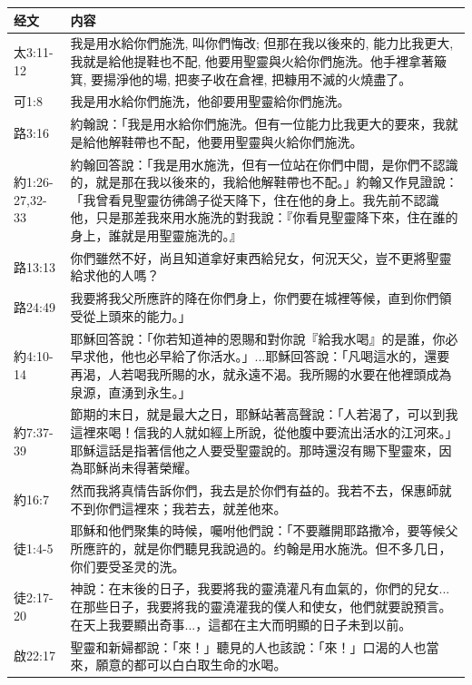 \begin{table}[H]
\centering
\begin{tabular}{p{4em}|p{44em}}  \toprule
经文&内容 \\  \midrule
太3:11-12&我是用水給你們施洗, 叫你們悔改; 但那在我以後來的, 能力比我更大, 我就是給他提鞋也不配, 他要用聖靈與火給你們施洗。他手裡拿著簸箕, 要揚淨他的場, 把麥子收在倉裡, 把糠用不滅的火燒盡了。\\  \midrule

可1:8&我是用水給你們施洗，他卻要用聖靈給你們施洗。\\  \midrule

路3:16&約翰說：「我是用水給你們施洗。但有一位能力比我更大的要來，我就是給他解鞋帶也不配，他要用聖靈與火給你們施洗。\\  \midrule

約1:26-27,32-33&約翰回答說：「我是用水施洗，但有一位站在你們中間，是你們不認識的，就是那在我以後來的，我給他解鞋帶也不配。」約翰又作見證說：「我曾看見聖靈彷彿鴿子從天降下，住在他的身上。我先前不認識他，只是那差我來用水施洗的對我說：『你看見聖靈降下來，住在誰的身上，誰就是用聖靈施洗的。』\\  \midrule

路13:13&你們雖然不好，尚且知道拿好東西給兒女，何況天父，豈不更將聖靈給求他的人嗎？\\  \midrule

路24:49&我要將我父所應許的降在你們身上，你們要在城裡等候，直到你們領受從上頭來的能力。」\\  \midrule

約4:10-14&耶穌回答說：「你若知道神的恩賜和對你說『給我水喝』的是誰，你必早求他，他也必早給了你活水。」...耶穌回答說：「凡喝這水的，還要再渴，人若喝我所賜的水，就永遠不渴。我所賜的水要在他裡頭成為泉源，直湧到永生。」\\  \midrule

約7:37-39&節期的末日，就是最大之日，耶穌站著高聲說：「人若渴了，可以到我這裡來喝！信我的人就如經上所說，從他腹中要流出活水的江河來。」耶穌這話是指著信他之人要受聖靈說的。那時還沒有賜下聖靈來，因為耶穌尚未得著榮耀。\\  \midrule

約16:7&然而我將真情告訴你們，我去是於你們有益的。我若不去，保惠師就不到你們這裡來；我若去，就差他來。\\  \midrule

徒1:4-5&耶穌和他們聚集的時候，囑咐他們說：「不要離開耶路撒冷，要等候父所應許的，就是你們聽見我說過的。约翰是用水施洗。但不多几日，你们要受圣灵的洗。\\  \midrule

徒2:17-20&神說：在末後的日子，我要將我的靈澆灌凡有血氣的，你們的兒女...在那些日子，我要將我的靈澆灌我的僕人和使女，他們就要說預言。在天上我要顯出奇事...，這都在主大而明顯的日子未到以前。\\  \midrule
啟22:17&聖靈和新婦都說：「來！」聽見的人也該說：「來！」口渴的人也當來，願意的都可以白白取生命的水喝。\\  \midrule

\end{tabular}%
\end{table}

